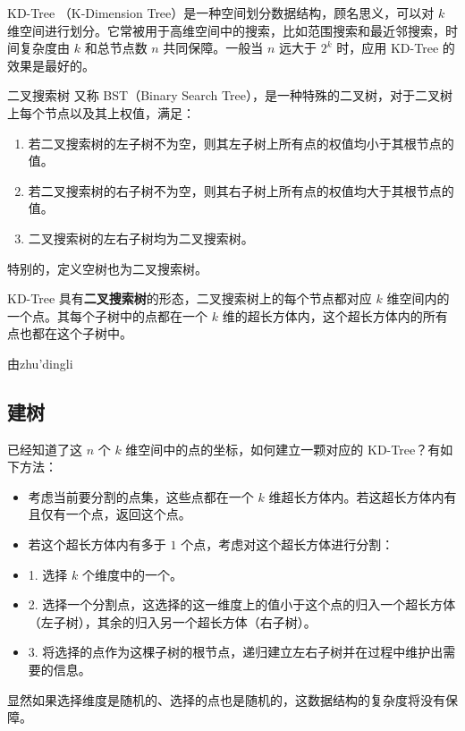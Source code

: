 
KD-Tree （K-Dimension Tree）是一种空间划分数据结构，顾名思义，可以对 $k$ 维空间进行划分。它常被用于高维空间中的搜索，比如范围搜索和最近邻搜索，时间复杂度由 $k$ 和总节点数 $n$ 共同保障。一般当 $n$ 远大于 $2^k$ 时，应用 KD-Tree 的效果是最好的。

\begin{definition}{二叉搜索树}
又称 BST（Binary Search Tree），是一种特殊的二叉树，对于二叉树上每个节点以及其上权值，满足：
\begin{enumerate}
\item 若二叉搜索树的左子树不为空，则其左子树上所有点的权值均小于其根节点的值。
\item 若二叉搜索树的右子树不为空，则其右子树上所有点的权值均大于其根节点的值。
\item 二叉搜索树的左右子树均为二叉搜索树。
\end{enumerate}
特别的，定义空树也为二叉搜索树。
\end{definition}

KD-Tree 具有\textbf{二叉搜索树}的形态，二叉搜索树上的每个节点都对应 $k$ 维空间内的一个点。其每个子树中的点都在一个 $k$ 维的超长方体内，这个超长方体内的所有点也都在这个子树中。

由zhu'dingli

\subsection{建树}

已经知道了这 $n$ 个 $k$ 维空间中的点的坐标，如何建立一颗对应的 KD-Tree？有如下方法：

\begin{itemize}
\item 考虑当前要分割的点集，这些点都在一个 $k$ 维超长方体内。若这超长方体内有且仅有一个点，返回这个点。
\item 若这个超长方体内有多于 $1$ 个点，考虑对这个超长方体进行分割：
\item 1. 选择 $k$ 个维度中的一个。
    \item 2. 选择一个分割点，这选择的这一维度上的值小于这个点的归入一个超长方体（左子树），其余的归入另一个超长方体（右子树）。
    \item 3. 将选择的点作为这棵子树的根节点，递归建立左右子树并在过程中维护出需要的信息。
\end{itemize}

显然如果选择维度是随机的、选择的点也是随机的，这数据结构的复杂度将没有保障。

